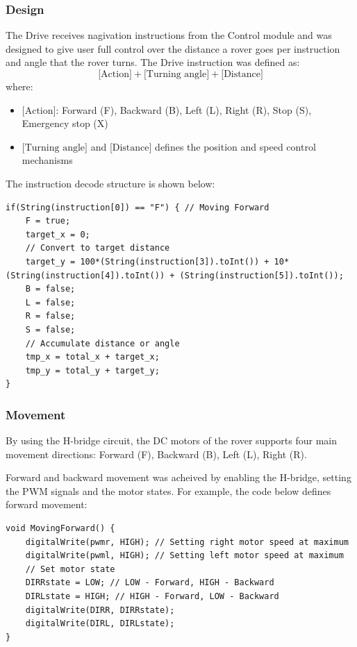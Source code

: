 \documentclass[11pt, a4paper]{article}
\begin{document}
\subsubsection{Design}

The Drive receives nagivation instructions from the Control module and was designed to give user full control over the distance a rover goes per instruction and angle that the rover turns. The Drive instruction was defined as:
$$
\text{[Action]} + \text{[Turning angle]} + \text{[Distance]}
$$
where:
\begin{itemize}
    \item $\text{[Action]}$: Forward (F), Backward (B), Left (L), Right (R), Stop (S), Emergency stop (X)
    \item $\text{[Turning angle]}$ and $\text{[Distance]}$ defines the position and speed control mechanisms
\end{itemize}

The instruction decode structure is shown below:
\begin{lstlisting}
if(String(instruction[0]) == "F") { // Moving Forward
    F = true;
    target_x = 0;
    // Convert to target distance
    target_y = 100*(String(instruction[3]).toInt()) + 10*(String(instruction[4]).toInt()) + (String(instruction[5]).toInt()); 
    B = false;
    L = false;
    R = false;
    S = false;
    // Accumulate distance or angle
    tmp_x = total_x + target_x;
    tmp_y = total_y + target_y;
}
\end{lstlisting}

\subsubsection{Movement}

By using the H-bridge circuit, the DC motors of the rover supports four main movement directions: Forward (F), Backward (B), Left (L), Right (R). 

Forward and backward movement was acheived by enabling the H-bridge, setting the PWM signals and the motor states. For example, the code below defines forward movement: 

\begin{lstlisting}
void MovingForward() {
    digitalWrite(pwmr, HIGH); // Setting right motor speed at maximum 
    digitalWrite(pwml, HIGH); // Setting left motor speed at maximum 
    // Set motor state 
    DIRRstate = LOW; // LOW - Forward, HIGH - Backward
    DIRLstate = HIGH; // HIGH - Forward, LOW - Backward
    digitalWrite(DIRR, DIRRstate); 
    digitalWrite(DIRL, DIRLstate); 
} 
\end{lstlisting}
\end{document}
